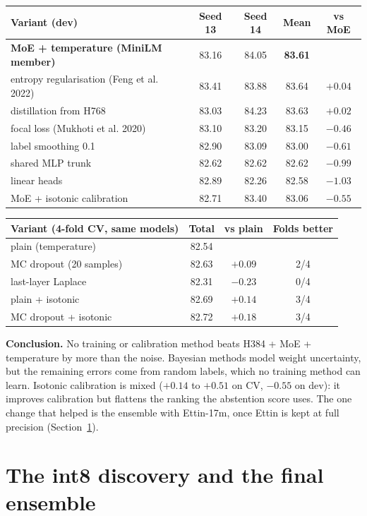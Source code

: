 \documentclass[10pt,a4paper]{article}
\begin{document}
\begin{center}
\begin{tabular}{lcccc}
\toprule
Variant (dev) & Seed 13 & Seed 14 & Mean & vs MoE \\
\midrule
\rowcolor{served} \textbf{MoE + temperature (MiniLM member)} & 83.16 & 84.05 & \textbf{83.61} & \\
entropy regularisation (Feng et al. 2022) & 83.41 & 83.88 & 83.64 & $+0.04$ \\
distillation from H768 & 83.03 & 84.23 & 83.63 & $+0.02$ \\
focal loss (Mukhoti et al. 2020) & 83.10 & 83.20 & 83.15 & $-0.46$ \\
label smoothing 0.1 & 82.90 & 83.09 & 83.00 & $-0.61$ \\
shared MLP trunk & 82.62 & 82.62 & 82.62 & $-0.99$ \\
linear heads & 82.89 & 82.26 & 82.58 & $-1.03$ \\
MoE + isotonic calibration & 82.71 & 83.40 & 83.06 & $-0.55$ \\
\bottomrule
\end{tabular}

\medskip
\begin{tabular}{lccc}
\toprule
Variant (4-fold CV, same models) & Total & vs plain & Folds better \\
\midrule
plain (temperature) & 82.54 & & \\
MC dropout (20 samples) & 82.63 & $+0.09$ & 2/4 \\
last-layer Laplace & 82.31 & $-0.23$ & 0/4 \\
plain + isotonic & 82.69 & $+0.14$ & 3/4 \\
MC dropout + isotonic & 82.72 & $+0.18$ & 3/4 \\
\bottomrule
\end{tabular}
\end{center}

\noindent\textbf{Conclusion.} No training or calibration method beats H384 + MoE +
temperature by more than the noise.
Bayesian methods model weight uncertainty, but the remaining errors come from random labels,
which no training method can learn. Isotonic calibration is mixed ($+0.14$ to $+0.51$ on CV,
$-0.55$ on dev): it improves calibration but flattens the ranking the abstention score uses.
The one change that helped is the ensemble with Ettin-17m, once Ettin is kept at full
precision (Section~\ref{sec:int8}).

\section{The int8 discovery and the final ensemble}\label{sec:int8}
\end{document}
